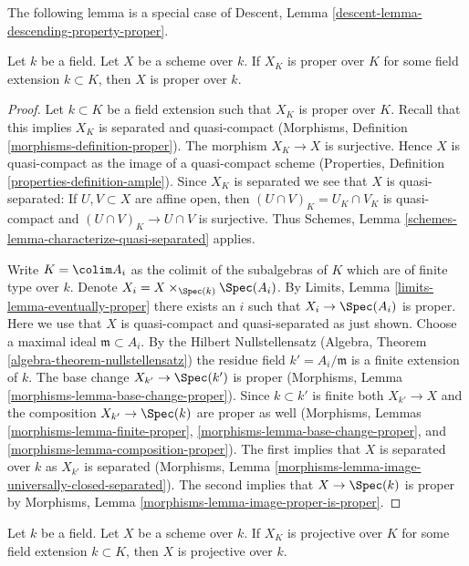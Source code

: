 \noindent
The following lemma is a special case of
Descent, Lemma \ref{descent-lemma-descending-property-proper}.

\begin{lemma}
\label{lemma-proper-after-field-extension}
Let $k$ be a field. Let $X$ be a scheme over $k$. If $X_K$ is proper
over $K$ for some field extension $k \subset K$, then $X$ is proper
over $k$.
\end{lemma}

\begin{proof}
Let $k \subset K$ be a field extension such that $X_K$ is proper over $K$.
Recall that this implies $X_K$ is separated and quasi-compact
(Morphisms, Definition \ref{morphisms-definition-proper}).
The morphism $X_K \to X$ is surjective. Hence $X$ is quasi-compact
as the image of a quasi-compact scheme (Properties, Definition
\ref{properties-definition-ample}). Since $X_K$ is separated
we see that $X$ is quasi-separated: If $U, V \subset X$ are
affine open, then $(U \cap V)_K = U_K \cap V_K$ is quasi-compact
and $(U \cap V)_K \to U \cap V$ is surjective. Thus
Schemes, Lemma \ref{schemes-lemma-characterize-quasi-separated} applies.

\medskip\noindent
Write $K = \colim A_i$ as the colimit of the subalgebras of $K$
which are of finite type over $k$. Denote
$X_i = X \times_{\Spec(k)} \Spec(A_i)$.
By Limits, Lemma \ref{limits-lemma-eventually-proper}
there exists an $i$ such that $X_i \to \Spec(A_i)$ is proper.
Here we use that $X$ is quasi-compact and quasi-separated as
just shown. Choose a maximal ideal $\mathfrak m \subset A_i$.
By the Hilbert Nullstellensatz
(Algebra, Theorem \ref{algebra-theorem-nullstellensatz})
the residue field $k' = A_i/\mathfrak m$ is a finite
extension of $k$.  The base change $X_{k'} \to \Spec(k')$
is proper (Morphisms, Lemma \ref{morphisms-lemma-base-change-proper}).
Since $k \subset k'$ is finite both $X_{k'} \to X$ and the composition
$X_{k'} \to \Spec(k)$
are proper as well (Morphisms, Lemmas \ref{morphisms-lemma-finite-proper},
\ref{morphisms-lemma-base-change-proper}, and
\ref{morphisms-lemma-composition-proper}).
The first implies that $X$ is separated over $k$ as $X_{k'}$
is separated
(Morphisms, Lemma \ref{morphisms-lemma-image-universally-closed-separated}).
The second implies that $X \to \Spec(k)$ is proper
by Morphisms, Lemma \ref{morphisms-lemma-image-proper-is-proper}.
\end{proof}

\begin{lemma}
\label{lemma-projective-after-field-extension}
Let $k$ be a field. Let $X$ be a scheme over $k$. If $X_K$ is projective
over $K$ for some field extension $k \subset K$, then $X$ is projective
over $k$.
\end{lemma}

